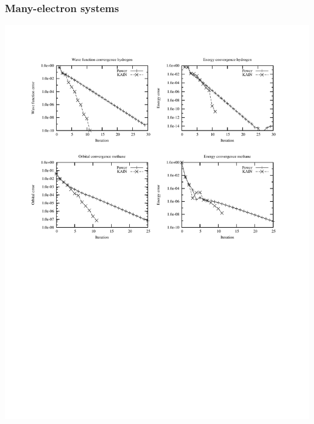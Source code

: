\documentclass[mathserif]{beamer}
\begin{document}
\begin{frame}
    \frametitle{Many-electron systems}
    \begin{center}
	\includegraphics[scale=0.6, clip, viewport = 50 350 540 530]{figures/convergence.pdf}
    \end{center}
\end{frame}
\end{document}
